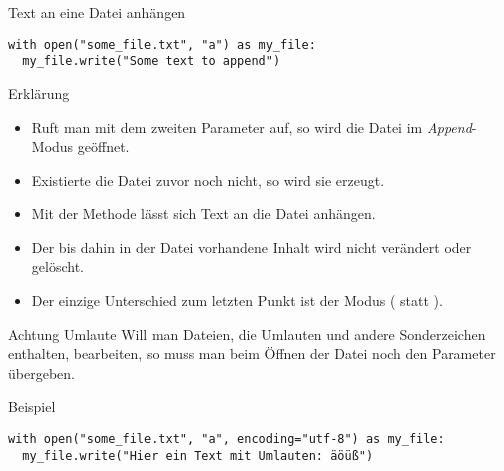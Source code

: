 \begin{fragile}
\begin{block}{Text an eine Datei anhängen}
\pause 
\vspace{2pt}

\begin{verbatim}
with open("some_file.txt", "a") as my_file:
  my_file.write("Some text to append")
\end{verbatim}

\pause
\vspace{12pt}

\begin{exampleblock}{Erklärung}
\vspace{2pt}
\begin{itemize}[<+->]
\item Ruft man  mit dem zweiten Parameter  auf, so wird die Datei im \emph{Append}-Modus geöffnet. 
\item Existierte die Datei zuvor noch nicht, so wird sie erzeugt. 
\item Mit der Methode  lässt sich Text an die Datei anhängen. 
\item Der bis dahin in der Datei vorhandene Inhalt wird nicht verändert oder gelöscht. 
\item Der einzige Unterschied zum letzten Punkt ist der Modus ( statt ).   
\end{itemize}
\end{exampleblock}
\end{block}

\end{fragile}

\begin{fragile}
	
\begin{alertblock}{Achtung Umlaute}
\vspace{2pt}
Will man Dateien, die Umlauten und andere Sonderzeichen enthalten, bearbeiten, so muss man beim Öffnen der Datei noch den Parameter  übergeben. 
\end{alertblock}	

 \vspace{12pt}
 
\begin{exampleblock}{Beispiel}
	\vspace{2pt}
\begin{verbatim}
with open("some_file.txt", "a", encoding="utf-8") as my_file:
  my_file.write("Hier ein Text mit Umlauten: äöüß")
\end{verbatim}
\end{exampleblock}

	
\end{fragile}


